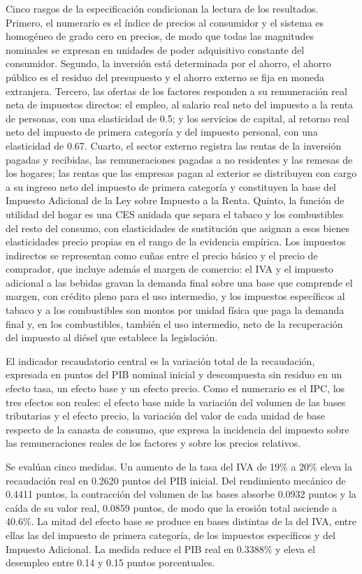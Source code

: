 \documentclass[11pt]{article}
\begin{document}
Cinco rasgos de la especificación condicionan la lectura de los resultados. Primero, el numerario es el índice de precios al consumidor y el sistema es homogéneo de grado cero en precios, de modo que todas las magnitudes nominales se expresan en unidades de poder adquisitivo constante del consumidor. Segundo, la inversión está determinada por el ahorro, el ahorro público es el residuo del presupuesto y el ahorro externo se fija en moneda extranjera. Tercero, las ofertas de los factores responden a su remuneración real neta de impuestos directos: el empleo, al salario real neto del impuesto a la renta de personas, con una elasticidad de 0.5; y los servicios de capital, al retorno real neto del impuesto de primera categoría y del impuesto personal, con una elasticidad de 0.67. Cuarto, el sector externo registra las rentas de la inversión pagadas y recibidas, las remuneraciones pagadas a no residentes y las remesas de los hogares; las rentas que las empresas pagan al exterior se distribuyen con cargo a su ingreso neto del impuesto de primera categoría y constituyen la base del Impuesto Adicional de la Ley sobre Impuesto a la Renta. Quinto, la función de utilidad del hogar es una CES anidada que separa el tabaco y los combustibles del resto del consumo, con elasticidades de sustitución que asignan a esos bienes elasticidades precio propias en el rango de la evidencia empírica. Los impuestos indirectos se representan como cuñas entre el precio básico y el precio de comprador, que incluye además el margen de comercio: el IVA y el impuesto adicional a las bebidas gravan la demanda final sobre una base que comprende el margen, con crédito pleno para el uso intermedio, y los impuestos específicos al tabaco y a los combustibles son montos por unidad física que paga la demanda final y, en los combustibles, también el uso intermedio, neto de la recuperación del impuesto al diésel que establece la legislación.

El indicador recaudatorio central es la variación total de la recaudación, expresada en puntos del PIB nominal inicial y descompuesta sin residuo en un efecto tasa, un efecto base y un efecto precio. Como el numerario es el IPC, los tres efectos son reales: el efecto base mide la variación del volumen de las bases tributarias y el efecto precio, la variación del valor de cada unidad de base respecto de la canasta de consumo, que expresa la incidencia del impuesto sobre las remuneraciones reales de los factores y sobre los precios relativos.

Se evalúan cinco medidas. Un aumento de la tasa del IVA de 19\% a 20\% eleva la recaudación real en 0.2620 puntos del PIB inicial. Del rendimiento mecánico de 0.4411 puntos, la contracción del volumen de las bases absorbe 0.0932 puntos y la caída de su valor real, 0.0859 puntos, de modo que la erosión total asciende a 40.6\%. La mitad del efecto base se produce en bases distintas de la del IVA, entre ellas las del impuesto de primera categoría, de los impuestos específicos y del Impuesto Adicional. La medida reduce el PIB real en 0.3388\% y eleva el desempleo entre 0.14 y 0.15 puntos porcentuales.
\end{document}
